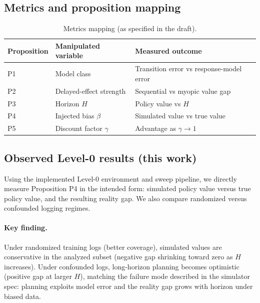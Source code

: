 \documentclass[11pt]{article}
\begin{document}
\subsection{Metrics and proposition mapping}
\begin{table}[t]
\centering
\caption{Metrics mapping (as specified in the draft).}
\begin{tabular}{@{}lll@{}}
\toprule
Proposition & Manipulated variable & Measured outcome \\ \midrule
P1 & Model class & Transition error vs response-model error \\
P2 & Delayed-effect strength & Sequential vs myopic value gap \\
P3 & Horizon $H$ & Policy value vs $H$ \\
P4 & Injected bias $\beta$ & Simulated value vs true value \\
P5 & Discount factor $\gamma$ & Advantage as $\gamma\rightarrow 1$ \\
\bottomrule
\end{tabular}
\end{table}

\subsection{Observed Level-0 results (this work)}
Using the implemented Level-0 environment and sweep pipeline, we directly measure Proposition P4 in the intended form: simulated policy value versus true policy value, and the resulting reality gap. We also compare randomized versus confounded logging regimes.

\paragraph{Key finding.}
Under randomized training logs (better coverage), simulated values are conservative in the analyzed subset (negative gap shrinking toward zero as $H$ increases). Under confounded logs, long-horizon planning becomes optimistic (positive gap at larger $H$), matching the failure mode described in the simulator spec: planning exploits model error and the reality gap grows with horizon under biased data.
\end{document}
